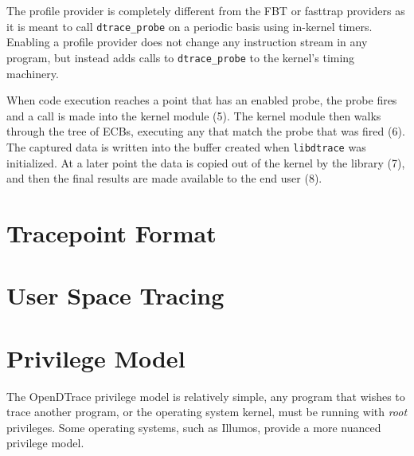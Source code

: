 The profile provider is completely different from the FBT or fasttrap
providers as it is meant to call \verb|dtrace_probe| on a periodic
basis using in-kernel timers.  Enabling a profile provider does not
change any instruction stream in any program, but instead adds calls
to \verb|dtrace_probe| to the kernel's timing machinery.

When code execution reaches a point that has an enabled probe, the
probe fires and a call is made into the kernel module (5). The kernel
module then walks through the tree of ECBs, executing any that match
the probe that was fired (6). The captured data is written into the
buffer created when \texttt{libdtrace} was initialized. At a later
point the data is copied out of the kernel by the library (7), and
then the final results are made available to the end user (8).

\section{Tracepoint Format}
\label{sec:tracepoint-format}

\section{User Space Tracing}
\label{sec:user-space}

\section{Privilege Model}
\label{sec:privilege}

The OpenDTrace privilege model is relatively simple, any program that
wishes to trace another program, or the operating system kernel, must
be running with \emph{root} privileges.  Some operating systems, such
as Illumos, provide a more nuanced privilege model.

